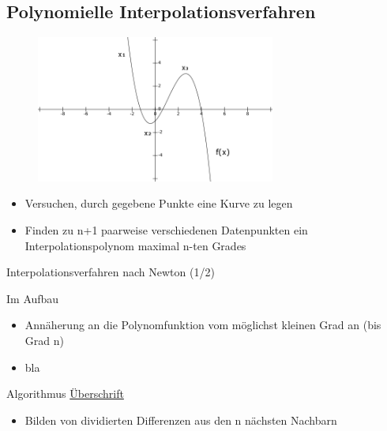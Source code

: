 \subsection{Polynomielle Interpolationsverfahren}
\begin{frame}{\insertsubsectionhead}
\begin{figure}
  \centering
     \includegraphics[width=0.7\textwidth]{pics/polynoms.png}
  \label{fig:Bild1}
\end{figure}
\begin{itemize}
\item Versuchen, durch gegebene Punkte eine Kurve zu legen
\item Finden zu n+1 paarweise verschiedenen Datenpunkten ein Interpolationspolynom maximal n-ten Grades
\end{itemize}
\end{frame}

\begin{frame}{Interpolationsverfahren nach Newton (1/2)}
\begin{block}{Im Aufbau}
\begin{itemize}
\item Annäherung an die Polynomfunktion vom möglichst kleinen Grad an (bis Grad n)
\item bla
\end{itemize}
\end{block}
\begin{block} {Algorithmus}
\underline{Überschrift}
\begin{itemize}
\item Bilden von dividierten Differenzen aus den n nächsten Nachbarn
\end{itemize}
\end{block}
\end{frame}

